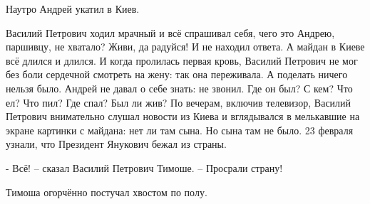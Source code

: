Наутро Андрей укатил в Киев.

Василий Петрович ходил мрачный и всё спрашивал себя, чего это Андрею, паршивцу, не хватало? Живи, да радуйся! И не находил ответа.
А майдан в Киеве всё длился и длился. И когда пролилась первая кровь, Василий Петрович не мог без боли сердечной смотреть на жену: так она переживала. А поделать ничего нельзя было. Андрей не давал о себе знать: не звонил. Где он был? С кем? Что ел? Что пил? Где спал? Был ли жив? По вечерам, включив телевизор, Василий Петрович внимательно слушал новости из Киева и вглядывался в мелькавшие на экране картинки с майдана: нет ли там сына. Но сына там не было.
23 февраля   узнали, что Президент Янукович бежал из страны.

- Всё! – сказал Василий Петрович Тимоше. – Просрали страну!

Тимоша огорчённо постучал хвостом по полу.

